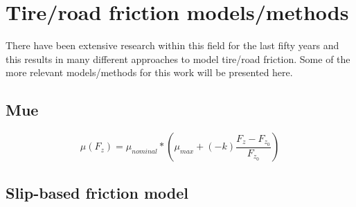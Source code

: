 \section{Tire/road friction models/methods}

There have been extensive research within this field for the last fifty years and this results in many different approaches to model tire/road friction. Some of the more relevant models/methods for this work will be presented here.

\subsection{Mue}

\begin{equation}
	\mu(F_{z})=\mu_{nominal}*(\mu_{max} + (-k)\frac{F_{z} - F_{z_{0}}}{F_{z_{0}}})
\end{equation}

\subsection{Slip-based friction model}
